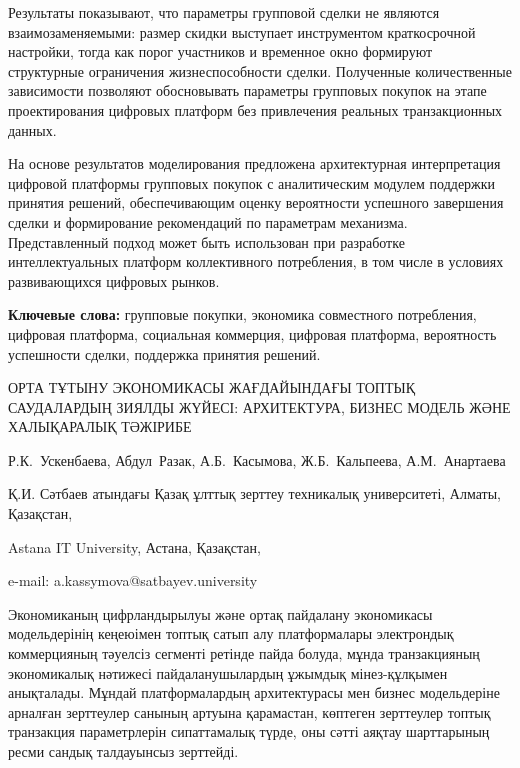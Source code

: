 Результаты показывают, что параметры групповой сделки не являются
взаимозаменяемыми: размер скидки выступает инструментом краткосрочной
настройки, тогда как порог участников и временное окно формируют
структурные ограничения жизнеспособности сделки. Полученные
количественные зависимости позволяют обосновывать параметры групповых
покупок на этапе проектирования цифровых платформ без привлечения
реальных транзакционных данных.

На основе результатов моделирования предложена архитектурная
интерпретация цифровой платформы групповых покупок с аналитическим
модулем поддержки принятия решений, обеспечивающим оценку вероятности
успешного завершения сделки и формирование рекомендаций по параметрам
механизма. Представленный подход может быть использован при разработке
интеллектуальных платформ коллективного потребления, в том числе в
условиях развивающихся цифровых рынков.

{\bfseries Ключевые слова:} групповые покупки, экономика совместного
потребления, цифровая платформа, социальная коммерция, цифровая
платформа, вероятность успешности сделки, поддержка принятия решений.

\begin{header}
ОРТА ТҰТЫНУ ЭКОНОМИКАСЫ ЖАҒДАЙЫНДАҒЫ ТОПТЫҚ САУДАЛАРДЫҢ ЗИЯЛДЫ ЖҮЙЕСІ: АРХИТЕКТУРА, БИЗНЕС МОДЕЛЬ ЖӘНЕ ХАЛЫҚАРАЛЫҚ ТӘЖІРИБЕ

Р.К.~Ускенбаева,
Абдул~Разак,
А.Б.~Касымова\envelope,
Ж.Б.~Кальпеева,
А.М.~Анартаева
\end{header}

\begin{affil}
Қ.И. Сәтбаев атындағы Қазақ ұлттық зерттеу техникалық университеті, Алматы, Қазақстан,

Astana IT University, Астана, Қазақстан,

e-mail: a.kassymova@satbayev.university
\end{affil}

Экономиканың цифрландырылуы және ортақ пайдалану экономикасы
модельдерінің кеңеюімен топтық сатып алу платформалары электрондық
коммерцияның тәуелсіз сегменті ретінде пайда болуда, мұнда транзакцияның
экономикалық нәтижесі пайдаланушылардың ұжымдық мінез-құлқымен
анықталады. Мұндай платформалардың архитектурасы мен бизнес модельдеріне
арналған зерттеулер санының артуына қарамастан, көптеген зерттеулер
топтық транзакция параметрлерін сипаттамалық түрде, оны сәтті аяқтау
шарттарының ресми сандық талдауынсыз зерттейді.

